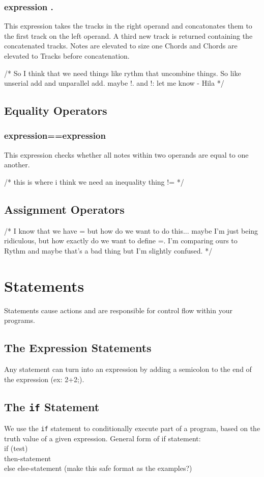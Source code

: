 \documentclass[letterpaper]{article}
\begin{document}
\subsubsection{expression .}
This expression takes the tracks in the right operand and concatonates them to the first track on the left operand. A third new track is returned containing the concatenated tracks. Notes are elevated to size one Chords and Chords are elevated to Tracks before concatenation. 

/* So I think that we need things like rythm that uncombine things. So like unserial add and unparallel add. maybe !. and !: let me know - Hila
*/

\subsection{Equality Operators}
\subsubsection{expression==expression}
This expression checks whether all notes within two operands are equal to one another. 

/* this is where i think we need an inequality thing != */ 

\subsection{Assignment Operators}
/* I know that we have = but how do we want to do this... maybe I'm just being ridiculous, but how exactly do we want to define =. I'm comparing ours to Rythm and maybe that's a bad thing but I'm slightly confused. */


\section{Statements}
Statements cause actions and are responsible for control flow within your programs.
\subsection{The Expression Statements}
Any statement can turn into an expression by adding a semicolon to the end of the expression (ex: 2+2;). 
\subsection{The \texttt{if} Statement}
We use the \texttt{if} statement to conditionally execute part of a program, based on the truth value of a given expression.
General form of if statement: \\
if (test) \\
then-statement \\
else
else-statement (make this safe format as the examples?)
\end{document}
